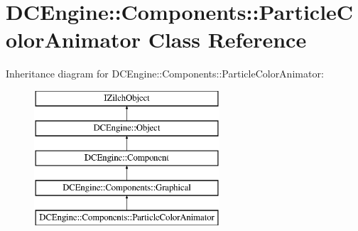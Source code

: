 \hypertarget{classDCEngine_1_1Components_1_1ParticleColorAnimator}{\section{D\-C\-Engine\-:\-:Components\-:\-:Particle\-Color\-Animator Class Reference}
\label{classDCEngine_1_1Components_1_1ParticleColorAnimator}
}
Inheritance diagram for D\-C\-Engine\-:\-:Components\-:\-:Particle\-Color\-Animator\-:\begin{figure}[H]
\begin{center}
\leavevmode
\includegraphics[height=5.000000cm]{classDCEngine_1_1Components_1_1ParticleColorAnimator}
\end{center}
\end{figure}
